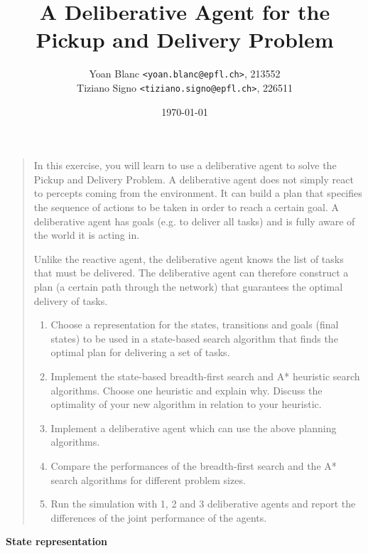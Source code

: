 \documentclass[11pt,a4paper]{article}
\title{\phantomsection%
    A Deliberative Agent for the Pickup and Delivery Problem
}
\author{
    Yoan Blanc \texttt{<yoan.blanc@epfl.ch>}, 213552\\
    Tiziano Signo \texttt{<tiziano.signo@epfl.ch>}, 226511
}
\date{\today}
\begin{document}
\maketitle

\noindent
\begin{quote}{\it

    In this exercise, you will learn to use a deliberative agent to solve the
Pickup and Delivery Problem. A deliberative agent does not simply react to
percepts coming from the environment. It can build a plan that specifies the
sequence of actions to be taken in order to reach a certain goal. A
deliberative agent has goals (e.g. to deliver all tasks) and is fully aware of
the world it is acting in.

    Unlike the reactive agent, the deliberative agent knows the list of tasks
that must be delivered. The deliberative agent can therefore construct a plan
(a certain path through the network) that guarantees the optimal delivery of
tasks.

    \begin{enumerate}
        \item Choose a representation for the states, transitions and goals
        (final states) to be used in a state-based search algorithm that finds
        the optimal plan for delivering a set of tasks.

        \item Implement the state-based breadth-first search and A* heuristic
        search algorithms.  Choose one heuristic and explain why. Discuss the
        optimality of your new algorithm in relation to your heuristic.

        \item Implement a deliberative agent which can use the above planning
        algorithms.

        \item Compare the performances of the breadth-first search and the A*
        search algorithms for different problem sizes.

        \item Run the simulation with 1, 2 and 3 deliberative agents and report
        the differences of the joint performance of the agents.

    \end{enumerate}

}\end{quote}

\newpage
\medskip
\textbf{State representation}
\end{document}
